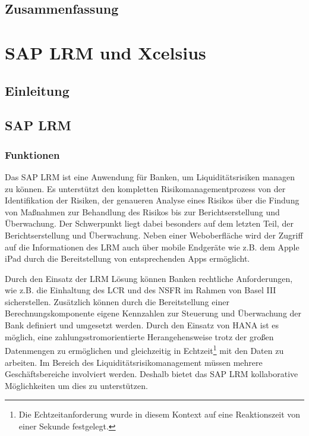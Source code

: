 \section{Zusammenfassung}

\chapter{SAP LRM und Xcelsius}
\section{Einleitung}
\section{SAP LRM}

\subsection{Funktionen}
Das SAP LRM ist eine Anwendung für Banken, um Liquiditätsrisiken managen zu können. Es unterstützt den kompletten Risikomanagementprozess von der Identifikation der Risiken, der genaueren Analyse eines Risikos über die Findung von Maßnahmen zur Behandlung des Risikos bis zur Berichtserstellung und Überwachung. Der Schwerpunkt liegt dabei besonders auf dem letzten Teil, der Berichtserstellung und Überwachung. Neben einer Weboberfläche wird der Zugriff auf die Informationen des LRM auch über mobile Endgeräte wie z.B. dem Apple iPad durch die Bereitstellung von entsprechenden Apps ermöglicht.

Durch den Einsatz der LRM Lösung können Banken rechtliche Anforderungen, wie z.B. die Einhaltung des \gls{LCR} und des \gls{NSFR} im Rahmen von Basel III sicherstellen. Zusätzlich können durch die Bereitstellung einer Berechnungskomponente eigene Kennzahlen zur Steuerung und Überwachung der Bank definiert und umgesetzt werden. Durch den Einsatz von \gls{HANA} ist es möglich, eine zahlungsstromorientierte Herangehensweise trotz der großen Datenmengen zu ermöglichen und gleichzeitig in Echtzeit\footnote{Die Echtzeitanforderung wurde in diesem Kontext auf eine Reaktionszeit von einer Sekunde festgelegt.} mit den Daten zu arbeiten. Im Bereich des Liquiditätsrisikomanagement müssen mehrere Geschäftsbereiche involviert werden. Deshalb bietet das SAP LRM kollaborative Möglichkeiten um dies zu unterstützen.

